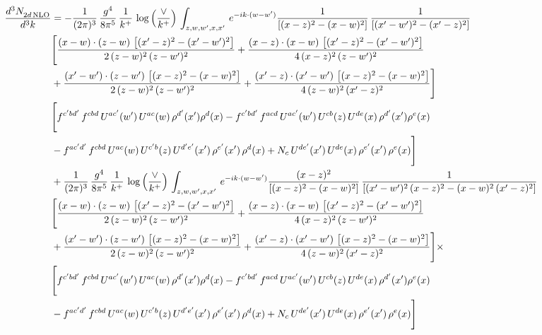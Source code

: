 \documentclass[9pt]{article}
\numberwithin{equation}{section}
\begin{document}
\begin{align}
 \frac{d^{3}N_{2d\,\rm NLO}^{\rm}}{d^{3}k}  & =  -\frac{1}{(2\pi)^{3}}\, \frac{g^{4}}{8\pi^{5}}\,\frac{1}{k^{+}}\,\log{\left(\frac{\vee}{k^{+}}\right)}\,\int_{z,w,w^{\prime},x,x'}\, e^{-ik\cdot (w-w')}\frac{1}{\left[(x-z)^{2}-(x-w)^{2}\right]}\, \frac{1}{\left[(x'-w')^{2}-(x'-z)^{2}\right]}\notag \\ & \Bigg[\frac{(x-w)\cdot (z-w)\, \left[(x'-z)^{2}-(x'-w')^{2}\right]}{2\, (z-w)^{2}\, (z-w')^{2}}  + \frac{(x-z)\cdot (x-w)\,\left[(x'-z)^{2}-(x'-w')^{2}\right] }{4\,(x-z)^{2}\,(z-w')^{2}}\notag \\ & +\frac{(x'-w')\cdot (z-w')\, \left[(x-z)^{2}-(x-w)^{2}\right]}{2\, (z-w)^{2}\, (z-w')^{2}}+ \frac{(x'-z)\cdot (x'-w')\, \left[(x-z)^{2}-(x-w)^{2}\right]}{4\, (z-w)^{2}\,(x'-z)^{2}}\Bigg] \notag \\ &  \Bigg[f^{c'bd'}\,f^{cbd}\, U^{ac'}(w')\,U^{ac}(w)\,\rho^{d'}(x')\rho^{d}(x)- f^{c'bd'}\,f^{acd}\,U^{ac'}(w')\,U^{cb}(z)\,U^{de}(x)\,\rho^{d'}(x')\rho^{e}(x) \notag \\ & -f^{ac'd'}\,f^{cbd}\,U^{ac}(w)\,U^{c'b}(z)\,U^{d'e'}(x')\,\rho^{e'}(x')\,\rho^{d}(x) +N_{c}\,U^{de'}(x')\,U^{de}(x)\,\rho^{e'}(x')\,\rho^{e}(x)\Bigg]  \notag \\
& +\frac{1}{(2\pi)^{3}}\, \frac{g^{4}}{8\pi^{5}}\,\frac{1}{k^{+}}\,\log{\left(\frac{\vee}{k^{+}}\right)}\,\int_{z,w,w^{\prime},x,x'}\, e^{-ik\cdot (w-w')}\frac{(x-z)^{2}}{\left[(x-z)^{2}-(x-w)^{2}\right]}\,\frac{1}{\left[(x'-w')^{2}\,(x-z)^{2} - (x-w)^{2}\,(x'-z)^{2}\right]}\notag \\ & \Bigg[\frac{(x-w)\cdot (z-w)\, \left[(x'-z)^{2}-(x'-w')^{2}\right]}{2\, (z-w)^{2}\, (z-w')^{2}}  + \frac{(x-z)\cdot (x-w)\,\left[(x'-z)^{2}-(x'-w')^{2}\right] }{4\,(x-z)^{2}\,(z-w')^{2}}\notag \\ & +\frac{(x'-w')\cdot (z-w')\, \left[(x-z)^{2}-(x-w)^{2}\right]}{2\, (z-w)^{2}\, (z-w')^{2}}+ \frac{(x'-z)\cdot (x'-w')\, \left[(x-z)^{2}-(x-w)^{2}\right]}{4\, (z-w)^{2}\,(x'-z)^{2}}\Bigg]\times\,\notag \\ & \Bigg[f^{c'bd'}\,f^{cbd}\, U^{ac'}(w')\,U^{ac}(w)\,\rho^{d'}(x')\rho^{d}(x)- f^{c'bd'}\,f^{acd}\,U^{ac'}(w')\,U^{cb}(z)\,U^{de}(x)\,\rho^{d'}(x')\rho^{e}(x) \notag \\ & -f^{ac'd'}\,f^{cbd}\,U^{ac}(w)\,U^{c'b}(z)\,U^{d'e'}(x')\,\rho^{e'}(x')\,\rho^{d}(x) +N_{c}\,U^{de'}(x')\,U^{de}(x)\,\rho^{e'}(x')\,\rho^{e}(x)\Bigg] \notag \\

\end{align}
\end{document}
